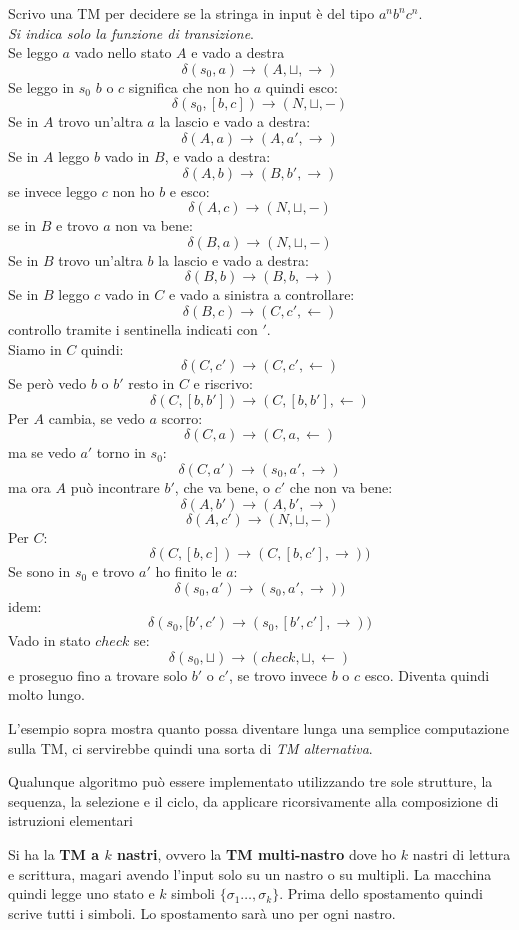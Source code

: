 \documentclass[a4paper,12pt, oneside]{book}
\begin{document}
\begin{esempio}
  Scrivo una TM per decidere se la stringa in input è del tipo $a^nb^nc^n$.\\
  \textit{Si indica solo la funzione di transizione}.\\
  Se leggo $a$ vado nello stato $A$ e vado a destra
  \[\delta(s_0,a)\to (A,\sqcup, \rightarrow)\]
  Se leggo in $s_0$ $b$ o $c$ significa che non ho $a$ quindi esco:
  \[\delta(s_0,[b,c])\to (N,\sqcup, -)\]
  Se in $A$ trovo un'altra $a$ la lascio e vado a destra:
  \[\delta(A,a)\to (A,a', \rightarrow)\]
  Se in $A$ leggo $b$ vado in $B$, e vado a destra:
  \[\delta(A,b)\to (B,b', \rightarrow)\]
  se invece leggo $c$ non ho $b$ e esco:
  \[\delta(A,c)\to (N,\sqcup, -)\]
  se in $B$ e trovo $a$ non va bene:
  \[\delta(B,a)\to (N,\sqcup, -)\]
  Se in $B$ trovo un'altra $b$ la lascio e vado a destra:
  \[\delta(B,b)\to (B,b, \rightarrow)\]
  Se in $B$ leggo $c$ vado in $C$ e vado a sinistra a controllare:
  \[\delta(B,c)\to (C,c', \leftarrow)\]
  controllo tramite i sentinella indicati con $'$.\\
  Siamo in $C$ quindi:
  \[\delta(C,c')\to (C,c', \leftarrow)\]
  Se però vedo $b$ o $b'$ resto in $C$ e riscrivo:
  \[\delta(C,[b,b'])\to (C,[b,b'], \leftarrow)\]
  Per $A$ cambia, se vedo $a$ scorro:
  \[\delta(C,a)\to (C,a, \leftarrow)\]
  ma se vedo $a'$ torno in $s_0$:
  \[\delta(C,a')\to (s_0,a', \rightarrow)\]
  ma ora $A$ può incontrare $b'$, che va bene, o $c'$ che non va bene:
  \[\delta(A,b')\to (A,b', \rightarrow)\]
  \[\delta(A,c')\to (N,\sqcup, -)\]
  Per $C$:
  \[\delta(C,[b,c])\to (C,[b,c'], \rightarrow))\]
  Se sono in $s_0$ e trovo $a'$ ho finito le $a$:
  \[\delta(s_0,a')\to (s_0,a' , \rightarrow))\]
  idem:
  \[\delta(s_0,[b',c')\to (s_0,[b',c'] , \rightarrow))\]
  Vado in stato $check$ se:
  \[\delta(s_0,\sqcup)\to(check,\sqcup, \leftarrow)\]
  e proseguo fino a trovare solo $b'$ o $c'$, se trovo invece $b$ o $c$ esco.
  Diventa quindi molto lungo.
\end{esempio}
L'esempio sopra mostra quanto possa diventare lunga una semplice computazione
sulla TM, ci servirebbe quindi una sorta di \textit{TM alternativa}.
\begin{teorema}
  Qualunque algoritmo può essere implementato utilizzando tre sole strutture, la
  sequenza, la selezione e il ciclo, da applicare ricorsivamente alla
  composizione di istruzioni elementari
\end{teorema}
\begin{definizione}
  Si ha la \textbf{TM a $k$ nastri}, ovvero la \textbf{TM
    multi-nastro} dove ho $k$ nastri di lettura e scrittura, magari avendo
  l'input solo su un nastro o su multipli. La macchina quindi legge uno stato e
  $k$ simboli $\{\sigma_1\ldots,\sigma_k\}$. Prima dello spostamento quindi
  scrive tutti i simboli. Lo spostamento sarà uno per ogni nastro.
\end{definizione}
\end{document}
